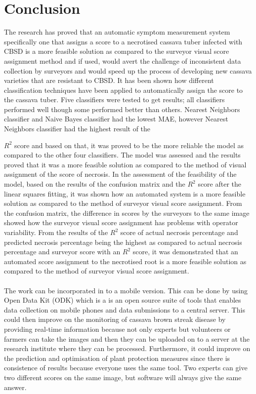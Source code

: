 \documentclass[conference]{IEEEtran}
\begin{document}
\section{Conclusion}
The research has proved that an automatic symptom measurement system specifically one that assigns a score to a necrotised cassava tuber infected with CBSD is a more feasible solution as compared to the surveyor visual score assignment method and if used, would avert the challenge of inconsistent data collection by surveyors and would speed up the process of developing new cassava varieties that are resistant to CBSD. It has been shown how different classification techniques have been applied to automatically assign the score to the cassava tuber. Five classifiers were tested to get results; all classifiers performed well though some performed better than others. Nearest Neighbors classifier and Naive Bayes classifier had the lowest MAE, however Nearest Neighbors classifier had the highest result of the {$R^{2}$ score and based on that, it was proved to be the more reliable the model as compared to the other four classifiers. The model was assessed and the results proved that it was a more feasible solution as compared to the method of visual assignment of the score of necrosis. In the assessment of the feasibility of the model, based on the results of the confusion matrix and the $R^{2}$ score after the linear squares fitting, it was shown how an automated system is a more feasible solution as compared to the method of surveyor visual score assignment. From the confusion matrix, the difference in scores by the surveyors to the same image showed how the surveyor visual score assignment has problems with operator variability. From the results of the $R^{2}$ score of actual necrosis percentage and predicted necrosis percentage being the highest as compared to actual necrosis percentage and surveyor score with an $R^{2}$ score, it was demonstrated that an automated score assignment to the necrotised root is a more feasible solution as compared to the method of surveyor visual score assignment.\\ \\ The work can be incorporated in to a mobile version. This can be done by using Open Data Kit (ODK) which is a is an open source suite of tools that enables data collection on mobile phones and data submissions to a central server. This could then improve on the monitoring of cassava brown streak disease by providing real-time information because not only experts but volunteers or farmers can take the images and then they can be uploaded on to a server at the research institute where they can be processed. Furthermore, it could improve on the prediction and optimisation of plant protection measures since there is consistence of results because everyone uses the same tool. Two experts can give two different scores on the same image, but software will always give the same answer.


}
\end{document}
